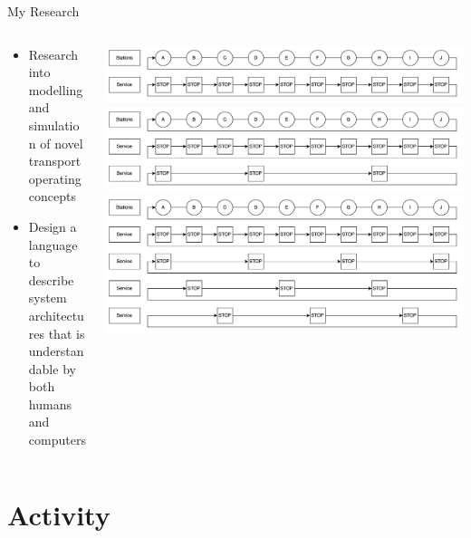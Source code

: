 \documentclass[
    aspectratio=169
]{beamer}
\begin{document}
\begin{frame}{My Research}
	\begin{columns}[T] %
		\begin{column}{0.5\textwidth}
			\begin{itemize}
				\item Research into modelling and simulation of novel transport operating concepts
				\item Design a language to describe system architectures that is understandable by both humans and computers
			\end{itemize}
		\end{column}
		
		\begin{column}{0.5\textwidth}
			\includegraphics[width=\textwidth]{images/service-all-stop.png}
			\includegraphics[width=\textwidth]{images/service-express-local.png}
			\includegraphics[width=\textwidth]{images/service-dss.png}
		\end{column}
	\end{columns}
	
\end{frame}

\section{Activity}
\end{document}
